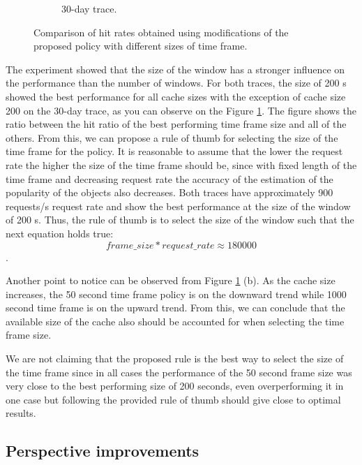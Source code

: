 \begin{figure}[t!]
\begin{subfigure}[b]{0.49\linewidth}
		\caption{30-day trace.}
	\end{subfigure}
	\caption{Comparison of hit rates obtained using modifications of the proposed policy with different sizes of time frame.}
	\label{fig:cache6}
\end{figure}

The experiment showed that the size of the window has a stronger influence on the performance than the number of windows. For both traces, the size of 200 s showed the best performance for all cache sizes with the exception of cache size 200 on the 30-day trace, as you can observe on the Figure \ref{fig:cache6}. The figure shows the ratio between the hit ratio of the best performing time frame size and all of the others. From this, we can propose a rule of thumb for selecting the size of the time frame for the policy. It is reasonable to assume that the lower the request rate the higher the size of the time frame should be, since with fixed length of the time frame and decreasing request rate the accuracy of the estimation of the popularity of the objects also decreases. Both traces have approximately 900 requests/s request rate and show the best performance at the size of the window of 200 s. Thus, the rule of thumb is to select the size of the window such that the next equation holds true: $$ frame\_size * request\_rate \approx  180000 $$.

Another point to notice can be observed from Figure \ref{fig:cache6} (b). As the cache size increases, the 50 second time frame policy is on the downward trend while 1000 second time frame is on the upward trend.  From this, we can conclude that the available size of the cache also should be accounted for when selecting the time frame size.

We are not claiming that the proposed rule is the best way to select the size of the time frame since in all cases the performance of the 50 second frame size was very close to the best performing size of 200 seconds, even overperforming it in one case but following the provided rule of thumb should give close to optimal results.

\subsection{Perspective improvements} \label{perspective_improvements}

